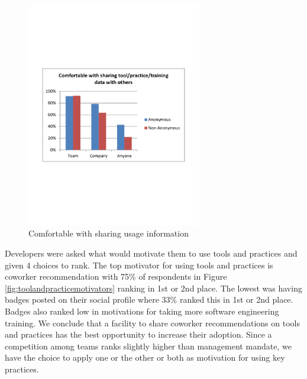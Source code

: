 \documentclass{sig-alternate}
\begin{document}
\begin{figure}\begin{mdframed}[linecolor=white]
	\includegraphics[width=3in]{ComfortWithSharing.pdf}
	\caption{Comfortable with sharing usage information}
	\label{fig:comfortwithsharing}
\end{mdframed}\end{figure}

Developers were asked what would motivate them to use tools and practices and given 4 choices to rank.  The top motivator for using tools and practices is coworker recommendation with 75\% of respondents in Figure \ref{fig:toolandpracticemotivators}   ranking in 1st or 2nd place. The lowest was having badges posted on their social profile where 33\% ranked this in 1st or 2nd place.   Badges also ranked low in motivations for taking more software engineering training.  We conclude that a facility to share coworker recommendations on tools and practices has the best opportunity to increase their adoption.  Since a competition among teams ranks slightly higher than management mandate, we have the choice to apply one or the other or both as motivation for using key practices.  
 
\end{document}
